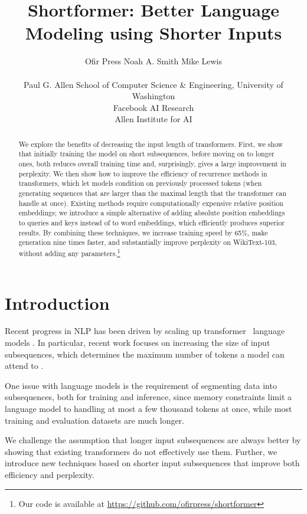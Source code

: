 \documentclass[11pt,a4paper]{article}
\title{Shortformer: Better Language Modeling using Shorter Inputs}
\author{Ofir Press  \quad Noah A. Smith \quad Mike Lewis\\
\\ Paul G. Allen School of Computer Science \& Engineering, University of Washington
\\ Facebook AI Research
\\ Allen Institute for AI
}
\date{}
\begin{document}
\maketitle
\begin{abstract}
We explore the benefits of decreasing the input length of transformers.
First, we show that initially training the model on short subsequences, before moving on to longer ones, both reduces overall training time and, surprisingly, gives a large improvement in perplexity.
We then show how to improve the efficiency of recurrence methods in transformers, which let models condition on previously processed tokens (when generating sequences that are larger than the maximal length that the transformer can handle at once). Existing methods require computationally expensive relative position embeddings; we introduce a simple alternative of adding absolute position embeddings to queries and keys instead of to word embeddings, which efficiently produces superior results. 
By combining these techniques, we increase training speed by 65\%, make generation nine times faster, and substantially improve perplexity on WikiText-103, without adding any parameters.\footnote{Our code is available at \url{https://github.com/ofirpress/shortformer}}




\end{abstract}
 \section{Introduction}
\label{sec:intro}

Recent progress in NLP has been driven by scaling up transformer~\cite{aiayn} language models \cite{gpt2,bart,t5,gpt3}. 
In particular, recent work focuses on increasing the size of input subsequences, which determines the maximum number of tokens a model can attend to \cite{baevski, sukhbaatar2019adaptive, kitaev2020reformer, roy2020efficient}.

One issue with language models is the requirement of segmenting data into subsequences, both for training and inference, since memory constraints limit a language model to handling at most a few thousand tokens at once, while most training and evaluation datasets are much longer. 

We challenge the assumption that longer input subsequences are always better by showing that existing transformers do not effectively use them. 
Further, we introduce new techniques based on shorter input subsequences that improve both efficiency and perplexity. 
\end{document}
